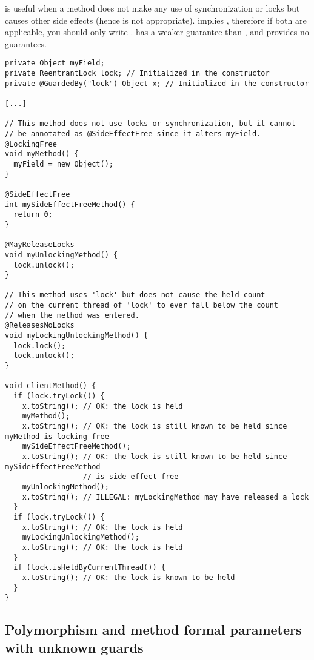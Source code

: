  is useful when a method does not make any use of synchronization
or locks but causes other side effects (hence  is not appropriate).
 implies , therefore if both are applicable,
you should only write .  has a weaker guarantee
than , and  provides no guarantees.

\begin{verbatim}
private Object myField;
private ReentrantLock lock; // Initialized in the constructor
private @GuardedBy("lock") Object x; // Initialized in the constructor

[...]

// This method does not use locks or synchronization, but it cannot
// be annotated as @SideEffectFree since it alters myField.
@LockingFree
void myMethod() {
  myField = new Object();
}

@SideEffectFree
int mySideEffectFreeMethod() {
  return 0;
}

@MayReleaseLocks
void myUnlockingMethod() {
  lock.unlock();
}

// This method uses 'lock' but does not cause the held count
// on the current thread of 'lock' to ever fall below the count
// when the method was entered.
@ReleasesNoLocks
void myLockingUnlockingMethod() {
  lock.lock();
  lock.unlock();
}

void clientMethod() {
  if (lock.tryLock()) {
    x.toString(); // OK: the lock is held
    myMethod();
    x.toString(); // OK: the lock is still known to be held since myMethod is locking-free
    mySideEffectFreeMethod();
    x.toString(); // OK: the lock is still known to be held since mySideEffectFreeMethod
                  // is side-effect-free
    myUnlockingMethod();
    x.toString(); // ILLEGAL: myLockingMethod may have released a lock
  }
  if (lock.tryLock()) {
    x.toString(); // OK: the lock is held
    myLockingUnlockingMethod();
    x.toString(); // OK: the lock is held
  }
  if (lock.isHeldByCurrentThread()) {
    x.toString(); // OK: the lock is known to be held
  }
}
\end{verbatim}


\subsection{Polymorphism and method formal parameters with unknown guards\label{lock-checker-polymorphism-example}}

